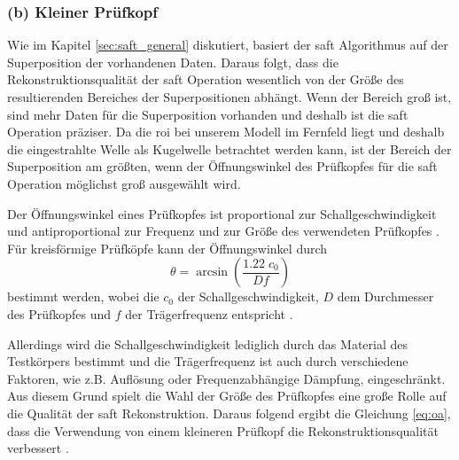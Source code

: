 \subsubsection*{(b) Kleiner Prüfkopf} \label{sec:oa}
Wie im Kapitel \ref{sec:saft_general} diskutiert, basiert der \acrshort{saft} Algorithmus auf der Superposition der vorhandenen Daten. Daraus folgt, dass die Rekonstruktionsqualität der \acrshort{saft} Operation wesentlich von der Größe des resultierenden Bereiches der Superpositionen abhängt. Wenn der Bereich groß ist, sind mehr Daten für die Superposition vorhanden und deshalb ist die \acrshort{saft} Operation präziser. Da die \acrshort{roi} bei unserem Modell im Fernfeld liegt und deshalb die eingestrahlte Welle als Kugelwelle betrachtet werden kann, ist der Bereich der Superposition am größten, wenn der Öffnungswinkel des Prüfkopfes für die \acrshort{saft} Operation möglichst groß ausgewählt wird. \par
Der Öffnungswinkel eines Prüfkopfes ist proportional zur Schallgeschwindigkeit und antiproportional zur Frequenz und zur Größe des verwendeten Prüfkopfes \cite{UTBeamDivergence}. Für kreisförmige Prüfköpfe kann der Öffnungswinkel durch 
\begin{equation} \label{eq:oa}
\theta = \arcsin \left ( \frac{1.22 \; c_0}{D f} \right )
\end{equation}
bestimmt werden, wobei die $c_0$ der Schallgeschwindigkeit, $D$ dem Durchmesser des Prüfkopfes und $f$ der Trägerfrequenz entspricht \cite{RajNDToaformula}. \par
Allerdings wird die Schallgeschwindigkeit lediglich durch das Material des Testkörpers bestimmt und die Trägerfrequenz ist auch durch verschiedene Faktoren, wie z.B. Auflösung oder Frequenzabhängige Dämpfung, eingeschränkt. Aus diesem Grund spielt die Wahl der Größe des Prüfkopfes eine große Rolle auf die Qualität der \acrshort{saft} Rekonstruktion. Daraus folgend ergibt die Gleichung \ref{eq:oa}, dass die Verwendung von einem kleineren Prüfkopf die Rekonstruktionsqualität verbessert \cite{Lingvall04PhD}. \par


